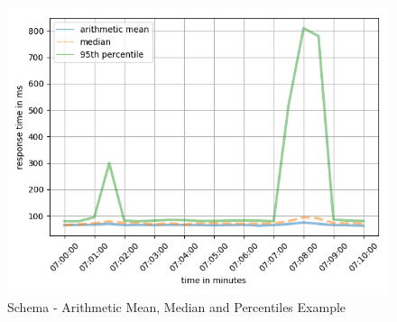 \begin{figure}[ht]
	\centering
  \includegraphics[width=1\textwidth]{mean_average_percentile_plot.png}
	\caption{Schema - Arithmetic Mean, Median and Percentiles Example}
	\label{schema_mean_average_percentile_plot}
\end{figure}

